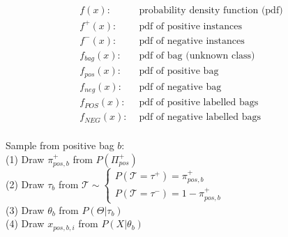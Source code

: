 \begin{align*}
  f(x) : & \text{ probability density function (pdf)} \\
  f^+(x) : & \text{ pdf of positive instances} \\
  f^-(x) : & \text{ pdf of negative instances} \\
  f_{bag}(x) : & \text{ pdf of bag (unknown class)} \\
  f_{pos}(x) : & \text{ pdf of positive bag} \\
  f_{neg}(x) : & \text{ pdf of negative bag} \\
  f_{POS} (x) : & \text{ pdf of positive labelled bags} \\
  f_{NEG} (x) : & \text{ pdf of negative labelled bags} \\
\end{align*}

Sample from positive bag $b$:\\
(1) Draw $\pi^+_{pos,b}$ from $P(\Pi^+_{pos})$ \\
(2) Draw $\tau_b$ from $ \mathcal{T}  \sim \begin{cases}
    P(\mathcal{T} = \tau^+) = \pi_{pos,b}^+\\
    P(\mathcal{T} = \tau^-)  = 1-\pi_{pos,b}^+
  \end{cases} $ \\
(3) Draw $\theta_b$ from $P(\Theta|\tau_b)$ \\
(4) Draw $x_{pos,b,i}$ from $P(X|\theta_b)$

